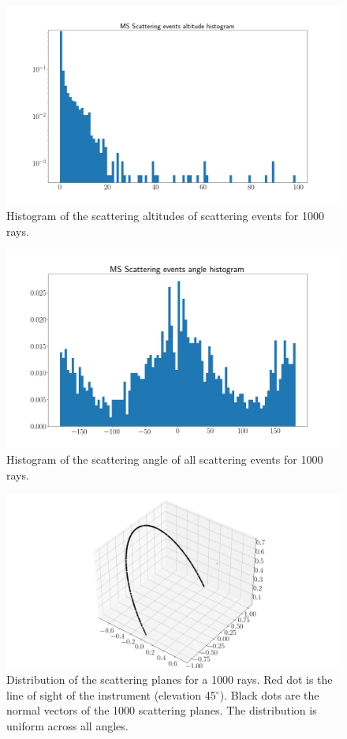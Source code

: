 \documentclass{article}
\begin{document}
\begin{figure}
  \includegraphics[width=\textwidth]{MS_alt_histo.png}
  \caption{Histogram of the scattering altitudes of scattering events for 1000 rays.}
\end{figure}
\begin{figure}
  \includegraphics[width=\textwidth]{MS_sca_angle_histo.png}
  \caption{Histogram of the scattering angle of all scattering events for 1000 rays.}
\end{figure}

\begin{figure}
  \includegraphics[width=\textwidth]{MS_sca_plane.png}
  \caption{Distribution of the scattering planes for a 1000 rays. Red dot is the line of sight of the instrument (elevation 45$^\circ$). Black dots are the normal vectors of the 1000 scattering planes. The distribution is uniform across all angles.}
\end{figure}
\end{document}
